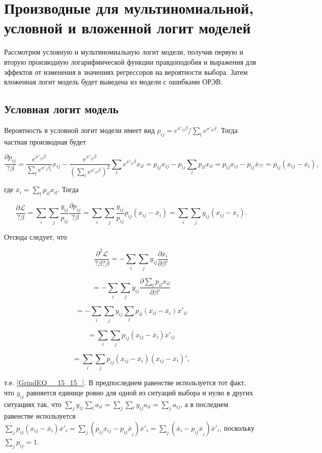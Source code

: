 \section{Производные для мультиномиальной, условной и вложенной логит моделей}

Рассмотрим условную и мультиномиальную логит модели, получив первую и вторую производную логарифмической функции правдоподобия и выражения для эффектов от изменения в значениях регрессоров на вероятности выбора. Затем вложенная логит модель будет выведена из модели с ошибками ОРЭВ.

\subsection{Условная логит модель}

Вероятность в условной логит модели имеет вид $p_{ij}={e^{x'_{ij}\beta }}/{\sum_l{e^{x'_{il}\beta }}}$. Тогда частная производная будет

\[\frac{\partial p_{ij}}{?\beta }=\frac{e^{x'_{ij}\beta }}{\sum_l{e^{x'_i{\beta }_l}}}x_{ij}-\frac{e^{x'_{ij}\beta }}{{\left(\sum_l{e^{x'_{il}\beta }}\right)}^2}\sum_l{e^{x'_{il}\beta }x_{il}}=p_{ij}x_{ij}-p_{ij}\sum_l{p_{il}x_{il}=}p_{ij}x_{ij}-p_{ij}{\overline{x}}_{??}=p_{ij}\left(x_{ij}-{\overline{x}}_i\right),\] 

где ${\overline{x}}_i=\sum_l{p_{il}x_{il}}$. Тогда 

\[\frac{\partial {\mathcal L}}{?\beta }=\sum_i{\sum_j{\frac{y_{ij}}{p_{ij}}}\frac{\partial p_{ij}}{?\beta }=\sum_i{\sum_j{\frac{y_{ij}}{p_{ij}}p_{ij}(x_{ij}-{\overline{x}}_i)=\sum_i{\sum_j{y_{ij}\left(x_{ij}-{\overline{x}}_i\right).}}}}}\] 

Отсюда следует, что 

\[\frac{{\partial }^2{\mathcal L}}{?\beta ?\beta }=-\sum_i{\sum_j{y_{ij}\frac{\partial {\overline{x}}_i}{\partial {\beta }'}}}\] 

\[=-\sum_i{\sum_j{y_{ij}\frac{\partial \sum_l{p_{il}x_{il}}}{\partial {\beta }'}}}\] 

\[=-\sum_i{\sum_j{y_{ij}\sum_l{p_{il}\left(x_{il}-{\overline{x}}_i\right)x'_{il}}}}\] 

\[=\sum_i{\sum_j{p_{ij}\left(x_{ij}-{\overline{x}}_i\right)x'_{ij}}}\] 

\[=\sum_i{\sum_j{p_{ij}\left(x_{ij}-{\overline{x}}_i\right)\left(x_{ij}-{\overline{x}}_i\right)'}},\] 

т.е. \eqref{GrindEQ__15_15_}. В предпоследнем равенстве используется тот факт, что $y_{ij}$ равняется единице ровно для одной из ситуаций выбора и нулю в других ситуациях так, что $\sum_j{y_{ij}\sum_l{a_{il}}}=\sum_j{\sum_l{y_{ij}a_{il}}}=\sum_j{a_{ij}}$, а в последнем равенстве используется$\sum_j{p_{ij}\left(x_{ij}-{\overline{x}}_i\right){\overline{x}}'_i}=\sum_j{\left(p_{ij}x_{ij}-{p_{ij}\overline{x}}_i\right){\overline{x}}'_i}=\sum_j{({\overline{x}}_i-{p_{ij}\overline{x}}_i)}{\overline{x}}'_i$, поскольку $\sum_j{p_{ij}=1}$.

